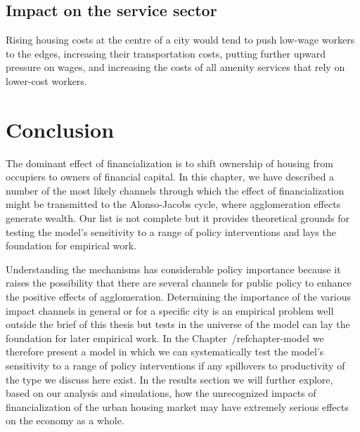 \subsection{Impact on the service sector}
Rising housing costs at the centre of a city would tend to push low-wage workers to the edges, increasing their transportation costs, putting further upward pressure on wages, and increasing the costs of all amenity services that rely on lower-cost workers.


\section{Conclusion}
 The dominant effect of financialization is to shift ownership of housing from occupiers to owners of financial capital. In this chapter, we have described a number of the most likely channels through which the effect of financialization might be transmitted to the Alonso-Jacobs cycle, where agglomeration effects generate wealth. Our list is not complete but it provides theoretical grounds for testing the model's sensitivity to a range of policy interventions and lays the foundation for empirical work.  

 Understanding the mechanisms has considerable policy importance because it raises the possibility that there are several channels for public policy to enhance the positive effects of agglomeration. Determining the importance of the various impact channels in general or for a specific city is an empirical problem well outside the brief of this thesis but tests in the universe of the model can lay the foundation for later empirical work.  In the Chapter~/ref{chapter-model} we therefore present a model in which we can systematically test the model's sensitivity to a range of policy interventions if any spillovers to productivity of the type we discuss here exist. In the results section we will further explore, based on our analysis and simulations, how the unrecognized impacts of financialization of the urban housing market may have extremely serious effects on the economy as a whole. 



